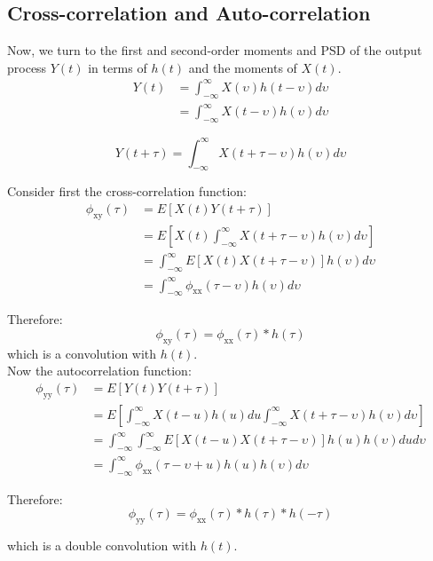\documentclass[12pt]{book}
\theoremstyle{definition}
\begin{document}
\subsection{Cross-correlation and Auto-correlation}
Now, we turn to the first and second-order moments and PSD of the output process \(Y(t)\) in terms of \(h(t)\) and the moments of \(X(t)\). \\
\[
\begin{split}
    Y(t) &  = \int_{-\infty}^\infty X(\upsilon)h(t-\upsilon) d\upsilon\\
    & = \int_{-\infty}^\infty X(t-\upsilon)h(\upsilon) d\upsilon
\end{split}
\]

\[
    Y(t+\tau)  = \int_{-\infty}^\infty X(t+\tau-\upsilon)h(\upsilon) d\upsilon
\]

Consider first the cross-correlation function:
\[
\begin{split}
    \phi_\mathrm{xy}(\tau) & = E [ X(t) Y(t+ \tau)]\\
    & = E \left [ X(t) \int_{-\infty}^\infty X(t+\tau-\upsilon)h(\upsilon) d\upsilon \right ] \\
    & = \int_{-\infty}^\infty E \left [ X(t)  X(t+\tau-\upsilon) \right ] h(\upsilon) d\upsilon  \\
    & = \int_{-\infty}^\infty \phi_\mathrm{xx}(\tau-\upsilon) h(\upsilon) d \upsilon
\end{split}
\]

Therefore:
\[
\boxed{\phi_\mathrm{xy}(\tau) = \phi_\mathrm{xx}(\tau) * h(\tau)}
\]
which is a convolution with \(h(t)\).\\

Now the autocorrelation function:
\[
\begin{split}
    \phi_\mathrm{yy}(\tau) & = E [ Y(t) Y(t+ \tau)]\\
    & = E \left [ \int_{-\infty}^\infty X(t-u)h(u) du \int_{-\infty}^\infty X(t+\tau-\upsilon)h(\upsilon) d\upsilon \right ] \\
    & = \int_{-\infty}^\infty \int_{-\infty}^\infty E \left [  X(t-u) X(t+\tau-\upsilon) \right ] h(u)   h(\upsilon) du d\upsilon  \\
    & = \int_{-\infty}^\infty \phi_\mathrm{xx}(\tau-\upsilon+u) h(u) h(\upsilon) d \upsilon
\end{split}
\]

Therefore:
\[
\boxed{\phi_\mathrm{yy}(\tau) = \phi_\mathrm{xx}(\tau) * h(\tau) * h(-\tau)}
\]

which is a double convolution with \(h(t)\).\\
\end{document}
